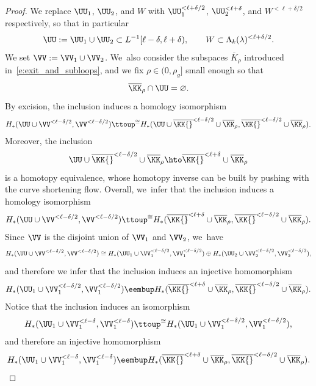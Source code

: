 \begin{proof}
We replace $\UU_1$, $\UU_2$, and $W$ with $\UU_1^{<\ell+\delta/2}$, $\UU_2^{<\ell+\delta}$, and $W^{<\ell+\delta/2}$ respectively, so that in particular
\[
\UU:=\UU_1\cup\UU_2\subset L^{-1}[\ell-\delta,\ell+\delta),
\qquad
W\subset\Lambda_k(\lambda)^{<\ell+\delta/2}.
\]
We set $\VV:=\VV_1\cup\VV_2$. We~also consider the subspaces $\overline K_\rho$ introduced in~\eqref{e:exit_and_subloops}, and we fix $\rho\in(0,\rho_g]$ small enough so that
\[
\overline\KK_\rho\cap\UU=\varnothing.
\]
By excision, the inclusion induces a homology isomorphism
\begin{align*}
H_*(\UU\cup\VV^{<\ell-\delta/2},\VV^{<\ell-\delta/2})
\ttoup^{\cong}
H_*(\UU\cup\overline\KK{}^{<\ell-\delta/2}\cup\overline\KK_\rho,\overline\KK{}^{<\ell-\delta/2}\cup\overline\KK_\rho).
\end{align*}
Moreover, the inclusion
\[
\UU\cup\overline\KK{}^{<\ell-\delta/2}\cup\overline\KK_\rho
\hto
\overline\KK{}^{<\ell+\delta}\cup\overline\KK_\rho
\]
is a homotopy equivalence, whose homotopy inverse can be built by pushing with the curve shortening flow. Overall, we~infer that the inclusion induces a homology isomorphism
\begin{align*}
H_*(\UU\cup\VV^{<\ell-\delta/2},\VV^{<\ell-\delta/2})
\ttoup^{\cong}
H_*(\overline\KK{}^{<\ell+\delta}\cup\overline\KK_\rho,\overline\KK{}^{<\ell-\delta/2}\cup\overline\KK_\rho).
\end{align*}
Since $\VV$ is the disjoint union of $\VV_1$ and $\VV_2$, we~have
\[
H_*(\UU\cup\VV^{<\ell-\delta/2},\VV^{<\ell-\delta/2})
\cong
H_*(\UU_1\cup\VV_1^{<\ell-\delta/2},\VV_1^{<\ell-\delta/2})
\oplus
H_*(\UU_2\cup\VV_2^{<\ell-\delta/2},\VV_2^{<\ell-\delta/2}),
\]
and therefore we infer that the inclusion induces an injective homomorphism
\begin{align*}
H_*(\UU_1\cup\VV_1^{<\ell-\delta/2},\VV_1^{<\ell-\delta/2})
\eembup
H_*(\overline\KK{}^{<\ell+\delta}\cup\overline\KK_\rho,\overline\KK{}^{<\ell-\delta/2}\cup\overline\KK_\rho).
\end{align*}
Notice that the inclusion induces an isomorphism
\begin{align*}
H_*(\UU_1\cup\VV_1^{<\ell-\delta},\VV_1^{<\ell-\delta})
\ttoup^{\cong}
H_*(\UU_1\cup\VV_1^{<\ell-\delta/2},\VV_1^{<\ell-\delta/2}),
\end{align*}
and therefore an injective homomorphism
\begin{align*}
H_*(\UU_1\cup\VV_1^{<\ell-\delta},\VV_1^{<\ell-\delta})
\eembup
H_*(\overline\KK{}^{<\ell+\delta}\cup\overline\KK_\rho,\overline\KK{}^{<\ell-\delta/2}\cup\overline\KK_\rho).
\end{align*}


\end{proof}
